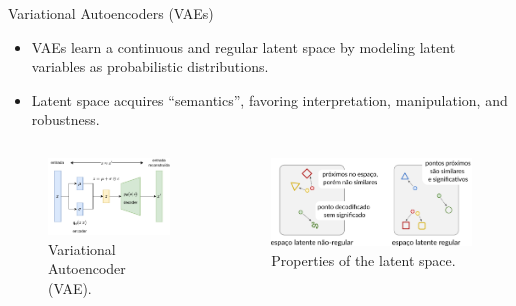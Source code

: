 \documentclass[aspectratio=169,xcolor=dvipsnames]{beamer}
\begin{document}
\begin{frame}{Variational Autoencoders (VAEs)}
    \begin{itemize}
        \item VAEs learn a \alert{continuous} and \alert{regular} latent space by modeling latent variables as probabilistic distributions.
        \item Latent space acquires ``semantics'', favoring interpretation, manipulation, and robustness.
    \end{itemize}
    \vspace{-1em}
    \begin{columns}[t]
        \begin{figure}
            \centering
            \includegraphics[width=0.8\linewidth]{imgs/vae.pdf}
            \caption{Variational Autoencoder (VAE).}
        \end{figure}

        \begin{figure}
            \centering
            \includegraphics[width=0.9\linewidth]{imgs/latent-space-properties.png}
            \caption{Properties of the latent space.}
        \end{figure}

    \end{columns}
\end{frame}
\end{document}
